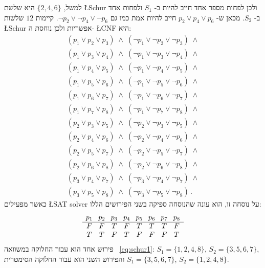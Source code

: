 למשל,
$\{2,4,6\}$
היא שלשת
\L{Schur}
ולכן לפחות מספר אחד חייב להיות ב-%
$S_1$
ולפחות אחד ב-%
$S_2$.
מכאן ש-%
$p_2 \vee p_4 \vee p_6$
חייב להיות אמת כמו גם 
$\neg p_2 \vee \neg p_4 \vee \neg p_6$.
קיימות 
$12$
שלשות 
\L{Schur}
אפשריות ולכן נוחסת ה-%
\L{CNF}
היא:
\begin{equation}
\begin{array}{l}
(p_1 \vee p_2 \vee p_3) \;\wedge\; (\neg p_1 \vee \neg p_2 \vee \neg p_3) \;\wedge \\
(p_1 \vee p_3 \vee p_4) \;\wedge\; (\neg p_1 \vee \neg p_3 \vee \neg p_4) \;\wedge \\
(p_1 \vee p_4 \vee p_5) \;\wedge\; (\neg p_1 \vee \neg p_4 \vee \neg p_5) \;\wedge \\
(p_1 \vee p_5 \vee p_6) \;\wedge\; (\neg p_1 \vee \neg p_5 \vee \neg p_6) \;\wedge \\
(p_1 \vee p_6 \vee p_7) \;\wedge\; (\neg p_1 \vee \neg p_6 \vee \neg p_7) \;\wedge \\
(p_1 \vee p_7 \vee p_8) \;\wedge\; (\neg p_1 \vee \neg p_7 \vee \neg p_8) \;\wedge \\
(p_2 \vee p_3 \vee p_5) \;\wedge\; (\neg p_2 \vee \neg p_3 \vee \neg p_5) \;\wedge \\
(p_2 \vee p_4 \vee p_6) \;\wedge\; (\neg p_2 \vee \neg p_4 \vee \neg p_6) \;\wedge \\
(p_2 \vee p_5 \vee p_7) \;\wedge\; (\neg p_2 \vee \neg p_5 \vee \neg p_7) \;\wedge \\
(p_2 \vee p_6 \vee p_8) \;\wedge\; (\neg p_2 \vee \neg p_6 \vee \neg p_8) \;\wedge \\
(p_3 \vee p_4 \vee p_7) \;\wedge\; (\neg p_3 \vee \neg p_4 \vee \neg p_7) \;\wedge \\
(p_3 \vee p_5 \vee p_8) \;\wedge\; (\neg p_3 \vee \neg p_5 \vee \neg p_8)\,.
\end{array}\label{eq.schur2}
\end{equation}
כאשר מפעילים 
\L{SAT solver}
על נוסחה זו, הוא עונה שהנוסחה ספיקה בשני הפירושים הללו:
\[
\begin{array}{c@{\hspace{8pt}}c@{\hspace{8pt}}c@{\hspace{8pt}}c@{\hspace{8pt}}c@{\hspace{8pt}}c@{\hspace{8pt}}c@{\hspace{8pt}}c}
p_1&p_2&p_3&p_4&p_5&p_6&p_7&p_8\\\hline
F&F&T&F&T&T&T&F\\
T&T&F&T&F&F&F&T
\end{array}
\]
פירוש אחד הוא עבור החלוקה במשוואה%
~\ref{eq:schur1}:
$S_1=\{1,2,4,8\}$, $S_2=\{3,5,6,7\}$, 
והפירוש השני הוא עבור החלוקה הסימטרית
 $S_1=\{3,5,6,7\}$, $S_2=\{1,2,4,8\}$.

